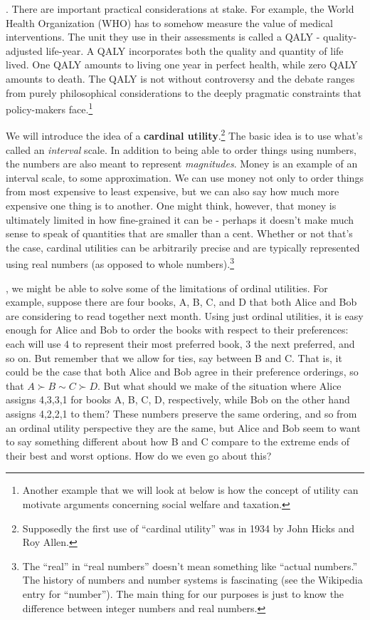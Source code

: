\documentclass[]{tufte-book}
\begin{document}
. There are important practical considerations at stake. For example, the World Health Organization (WHO) has to somehow measure the value of medical interventions. The unit they use in their assessments is called a QALY - quality-adjusted life-year. A QALY incorporates both the quality and quantity of life lived. One QALY amounts to living one year in perfect health, while zero QALY amounts to death. The QALY is not without controversy and the debate ranges from purely philosophical considerations to the deeply pragmatic constraints that policy-makers face.\footnote{Another example that we will look at below is how the concept of utility can motivate arguments concerning social welfare and taxation.}

We will introduce the idea of a \textbf{cardinal utility}.\footnote{Supposedly the first use of ``cardinal utility'' was in 1934 by John Hicks and Roy Allen.} The basic idea is to use what's called an \emph{interval} scale. In addition to being able to order things using numbers, the numbers are also meant to represent \emph{magnitudes}. Money is an example of an interval scale, to some approximation. We can use money not only to order things from most expensive to least expensive, but we can also say how much more expensive one thing is to another. One might think, however, that money is ultimately limited in how fine-grained it can be - perhaps it doesn't make much sense to speak of quantities that are smaller than a cent. Whether or not that's the case, cardinal utilities can be arbitrarily precise and are typically represented using real numbers (as opposed to whole numbers).\footnote{The ``real'' in ``real numbers'' doesn't mean something like ``actual numbers.'' The history of numbers and number systems is fascinating (see the Wikipedia entry for ``number''). The main thing for our purposes is just to know the difference between integer numbers and real numbers.}

, we might be able to solve some of the limitations of ordinal utilities. For example, suppose there are four books, A, B, C, and D that both Alice and Bob are considering to read together next month. Using just ordinal utilities, it is easy enough for Alice and Bob to order the books with respect to their preferences: each will use 4 to represent their most preferred book, 3 the next preferred, and so on. But remember that we allow for ties, say between B and C. That is, it could be the case that both Alice and Bob agree in their preference orderings, so that \(A\succ B\sim C \succ D\). But what should we make of the situation where Alice assigns 4,3,3,1 for books A, B, C, D, respectively, while Bob on the other hand assigns 4,2,2,1 to them? These numbers preserve the same ordering, and so from an ordinal utility perspective they are the same, but Alice and Bob seem to want to say something different about how B and C compare to the extreme ends of their best and worst options. How do we even go about this?
\end{document}
